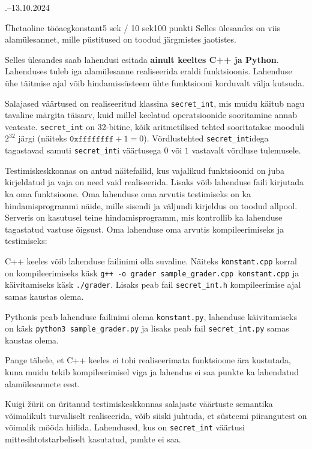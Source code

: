 \documentclass[a4paper,11pt]{article}
\begin{document}
\begin{ol}{\eio}{.--13.10.2024}{\yle}{}
\begin{yl}{7}{Ühetaoline tööaeg}{konstant}{5 sek / 10 sek}{100 punkti}
	Selles ülesandes on viis alamülesannet, mille püstitused on toodud järgmistes jaotistes.

	Selles ülesandes saab lahendusi esitada \textbf{ainult keeltes C++ ja Python}. Lahenduses tuleb iga alamülesanne realiseerida eraldi funktsioonis. Lahenduse ühe täitmise ajal võib hindamissüsteem ühte funktsiooni korduvalt välja kutsuda.

	Salajased väärtused on realiseeritud klassina \verb'secret_int', mis muidu käitub nagu tavaline märgita täisarv, kuid millel keelatud operatsioonide sooritamine annab veateate. \verb'secret_int' on 32-bitine, kõik aritmetilised tehted sooritatakse mooduli $2^{32}$ järgi (näiteks $\texttt{0xffffffff} + 1 = 0$). Võrdlustehted \verb'secret_int'idega tagastavad samuti \verb'secret_int'i väärtusega $0$ või $1$ vastavalt võrdluse tulemusele.

	Testimiskeskkonnas on antud näitefailid, kus vajalikud funktsioonid on juba kirjeldatud ja vaja on need vaid realiseerida. Lisaks võib lahenduse faili kirjutada ka oma funktsioone. Oma lahenduse oma arvutis testimiseks on ka hindamisprogrammi näide, mille sisendi ja väljundi kirjeldus on toodud allpool. Serveris on kasutusel teine hindamisprogramm, mis kontrollib ka lahenduse tagastatud vastuse õigsust. Oma lahenduse oma arvutis kompileerimiseks ja testimiseks:
	\begin{xitem}
		\item C++ keeles võib lahenduse failinimi olla suvaline. Näiteks \verb'konstant.cpp' korral on kompileerimiseks käsk \verb'g++ -o grader sample_grader.cpp konstant.cpp' ja käivitamiseks käsk \verb'./grader'. Lisaks peab fail \verb'secret_int.h' kompileerimise ajal samas kaustas olema.
		\item Pythonis peab lahenduse failinimi olema \verb'konstant.py', lahenduse käivitamiseks on käsk \verb'python3 sample_grader.py' ja lisaks peab fail \verb'secret_int.py' samas kaustas olema.
	\end{xitem}

	Pange tähele, et C++ keeles ei tohi realiseerimata funktsioone ära kustutada, kuna muidu tekib kompileerimisel viga ja lahendus ei saa punkte ka lahendatud alamülesannete eest.

	Kuigi žürii on üritanud testimiskeskkonnas salajaste väärtuste semantika võimalikult turvaliselt realiseerida, võib siiski juhtuda, et süsteemi piirangutest on võimalik mööda hiilida. Lahendused, kus on \verb'secret_int' väärtusi mittesihtotstarbeliselt kasutatud, punkte ei saa.


\end{yl}
\end{ol}
\end{document}

